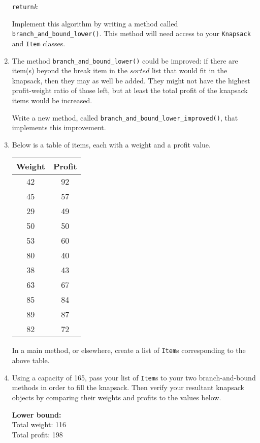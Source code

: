 \documentclass[11pt,a4paper]{report}
\begin{document}
\begin{enumerate}
\begin{alltt}
    return \(k\)
\end{alltt}
    Implement this algorithm by writing a method called \texttt{branch\_and\_bound\_lower()}. This method will need access to your \texttt{Knapsack} and \texttt{Item} classes.

    \item The method \texttt{branch\_and\_bound\_lower()} could be improved: if there are item(s) beyond the break item in the $sorted$ list that would fit in the knapsack, then they may as well be added. They might not have the highest profit-weight ratio of those left, but at least the total profit of the knapsack items would be increased.

    Write a new method, called \texttt{branch\_and\_bound\_lower\_improved()}, that implements this improvement.

    \item Below is a table of items, each with a weight and a profit value.\\
    \begin{center}
    \begin{tabular}{ c | c }
        Weight & Profit\\
        \hline
        \hline
        42 & 92\\
        45 & 57\\
        29 & 49\\
        50 & 50\\
        53 & 60\\
        80 & 40\\
        38 & 43\\
        63 & 67\\
        85 & 84\\
        89 & 87\\
        82 & 72\\
        \hline
    \end{tabular}
    \end{center}
    In a main method, or elsewhere, create a list of \texttt{Item}s corresponding to the above table.

    \item Using a capacity of 165, pass your list of \texttt{Item}s to your two branch-and-bound methods in order to fill the knapsack. Then verify your resultant knapsack objects by comparing their weights and profits to the values below.

    \textbf{Lower bound:}\\
    Total weight: 116\\
    Total profit: 198


\end{enumerate}
\end{document}
